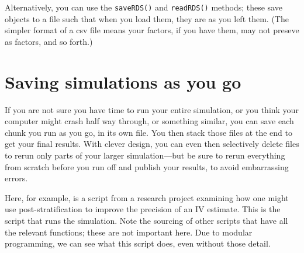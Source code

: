 \documentclass[
]{book}
\begin{document}
Alternatively, you can use the \texttt{saveRDS()} and \texttt{readRDS()} methods; these save objects to a file such that when you load them, they are as you left them.
(The simpler format of a csv file means your factors, if you have them, may not preseve as factors, and so forth.)

\section{Saving simulations as you go}\label{saving-simulations-as-you-go}

If you are not sure you have time to run your entire simulation, or you think your computer might crash half way through, or something similar, you can save each chunk you run as you go, in its own file. You then stack those files at the end to get your final results.
With clever design, you can even then selectively delete files to rerun only parts of your larger simulation---but be sure to rerun everything from scratch before you run off and publish your results, to avoid embarrassing errors.

Here, for example, is a script from a research project examining how one might use post-stratification to improve the precision of an IV estimate.
This is the script that runs the simulation.
Note the sourcing of other scripts that have all the relevant functions; these are not important here.
Due to modular programming, we can see what this script does, even without those detail.
\end{document}
